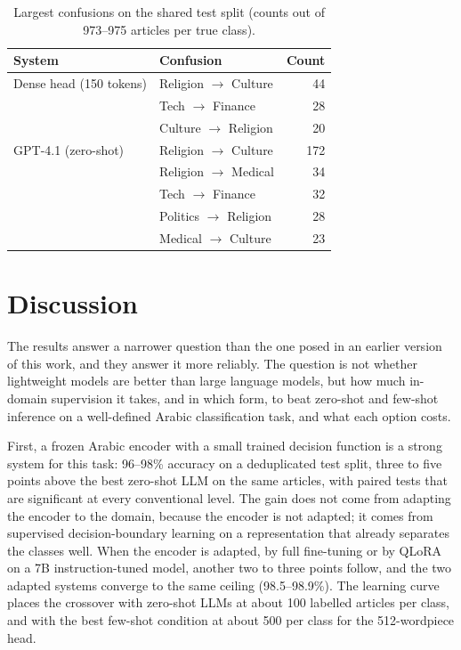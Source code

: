 \documentclass[preprint,12pt,authoryear]{elsarticle}
\newif\ifrevmarkup
\DeclareRobustCommand{\rev}[1]{\ifrevmarkup{\color{blue}#1}\else#1\fi}
\begin{document}
\begin{table}[h!]
    \centering
    \caption{Largest confusions on the shared test split (counts out of 973--975 articles per true class).}
    \label{tab:error-summary}
    \small
    \begin{tabular}{llr}
        \toprule
        \textbf{System} & \textbf{Confusion} & \textbf{Count} \\
        \midrule
        Dense head (150 tokens) & Religion $\to$ Culture & 44 \\
        & Tech $\to$ Finance & 28 \\
        & Culture $\to$ Religion & 20 \\
        \addlinespace
        GPT-4.1 (zero-shot) & Religion $\to$ Culture & 172 \\
        & Religion $\to$ Medical & 34 \\
        & Tech $\to$ Finance & 32 \\
        & Politics $\to$ Religion & 28 \\
        & Medical $\to$ Culture & 23 \\
        \bottomrule
    \end{tabular}
\end{table}

\section{Discussion}
\label{discussion}

The results answer a narrower question than the one posed in an earlier version of this work, and they answer it more reliably. \rev{The question is not whether lightweight models are better than large language models, but how much in-domain supervision it takes, and in which form, to beat zero-shot and few-shot inference on a well-defined Arabic classification task, and what each option costs.}

First, a frozen Arabic encoder with a small trained decision function is a strong system for this task: 96--98\% accuracy on a deduplicated test split, three to five points above the best zero-shot LLM on the same articles, with paired tests that are significant at every conventional level. \rev{The gain does not come from adapting the encoder to the domain, because the encoder is not adapted; it comes from supervised decision-boundary learning on a representation that already separates the classes well.} \rev{When the encoder is adapted, by full fine-tuning or by QLoRA on a 7B instruction-tuned model, another two to three points follow, and the two adapted systems converge to the same ceiling (98.5--98.9\%).} \rev{The learning curve places the crossover with zero-shot LLMs at about 100 labelled articles per class, and with the best few-shot condition at about 500 per class for the 512-wordpiece head.}
\end{document}
